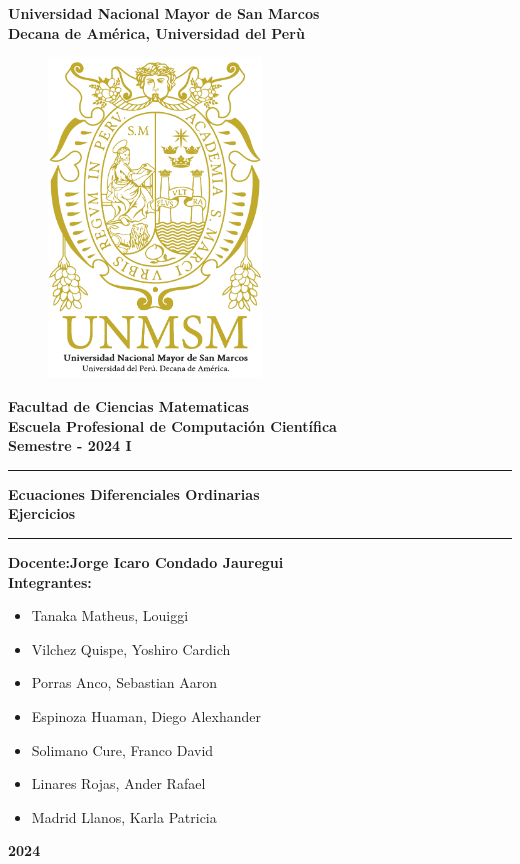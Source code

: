 \begin{titlepage}
\begin{center}
{ \LARGE\textbf{Universidad Nacional Mayor de San Marcos}}\\
 \vspace{3.5mm}
{\large \textbf{Decana de América, Universidad del Perù}}\\
  \vspace{3.5mm}
  \begin{figure}[h]
      \centering
      \includegraphics[height=8.5cm]{include/800px-UNMSM_escudo_XVI-XXI_transparente_siglas_nombre_vertical.svg.png}
  \end{figure}
{ \Large\textbf{Facultad de Ciencias Matematicas}}\\
 \vspace{3.5mm}
{ \large\textbf{Escuela Profesional de Computación Científica}}\\
 \vspace{3.5mm}
{ \large\textbf{Semestre - 2024 I}}\\
{\rule{\linewidth}{0.55mm}} 
 { \Large\textbf{Ecuaciones Diferenciales Ordinarias\\ Ejercicios}}\\
{\rule{\linewidth}{0.55mm}} 
{ \large\textbf{Docente:Jorge Icaro Condado Jauregui}}\\ \vspace{3.5mm}
{ \large\textbf{Integrantes: }}\\
 \vspace{3.5mm}
\begin{itemize}
    \item Tanaka Matheus, Louiggi 
    \item Vilchez Quispe, Yoshiro Cardich 
    \item Porras Anco, Sebastian Aaron 
    \item Espinoza Huaman, Diego Alexhander 
    \item Solimano Cure, Franco David 
    \item Linares Rojas, Ander Rafael 
    \item Madrid Llanos, Karla Patricia 
\end{itemize}
\vfill
{ \huge\textbf{2024}}
\end{center}
\end{titlepage}
